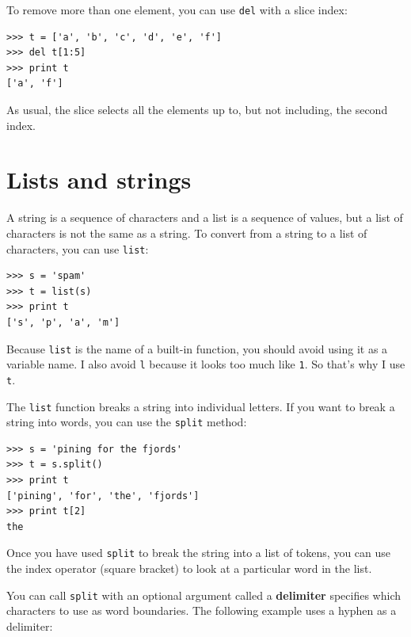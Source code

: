 \documentclass[10pt]{book}
\begin{document}

To remove more than one element, you can use {\tt del} with
a slice index:

\beforeverb
\begin{verbatim}
>>> t = ['a', 'b', 'c', 'd', 'e', 'f']
>>> del t[1:5]
>>> print t
['a', 'f']
\end{verbatim}
\afterverb
%
As usual, the slice selects all the elements up to, but not
including, the second index.


\section{Lists and strings}


A string is a sequence of characters and a list is a sequence
of values, but a list of characters is not the same as a
string.  To convert from a string to a list of characters,
you can use {\tt list}:


\beforeverb
\begin{verbatim}
>>> s = 'spam'
>>> t = list(s)
>>> print t
['s', 'p', 'a', 'm']
\end{verbatim}
\afterverb
%
Because {\tt list} is the name of a built-in function, you should
avoid using it as a variable name.  I also avoid {\tt l} because
it looks too much like {\tt 1}.  So that's why I use {\tt t}.

The {\tt list} function breaks a string into individual letters.  If
you want to break a string into words, you can use the {\tt split}
method:


\beforeverb
\begin{verbatim}
>>> s = 'pining for the fjords'
>>> t = s.split()
>>> print t
['pining', 'for', 'the', 'fjords']
>>> print t[2]
the
\end{verbatim}
\afterverb
%
Once you have used {\tt split} to break the string into 
a list of tokens, you can use the index operator (square
bracket) to look at a particular word in the list.

You can call {\tt split} with 
an optional argument called a {\bf delimiter} specifies which
characters to use as word boundaries.
The following example
uses a hyphen as a delimiter:

\end{document}
